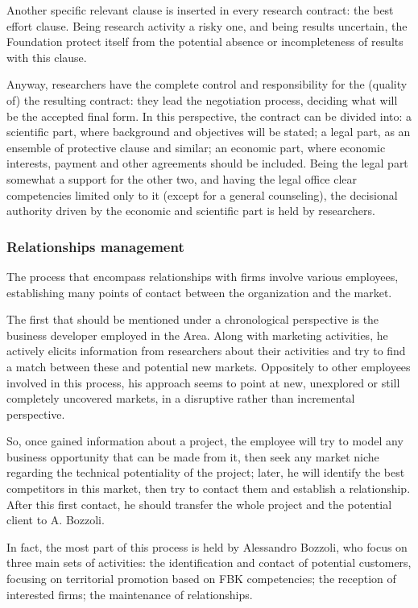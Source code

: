 Another specific relevant clause is inserted in every research contract: the best effort clause. Being research activity a risky one, and being results uncertain, the Foundation protect itself from the potential absence or incompleteness of results with this clause.  

Anyway, researchers have the complete control and responsibility for the (quality of) the resulting contract: they lead the negotiation process, deciding what will be the accepted final form. In this perspective, the contract can be divided into: a scientific part, where background and objectives will be stated; a legal part, as an ensemble of protective clause and similar; an economic part, where economic interests, payment and other agreements should be included. Being the legal part somewhat a support for the other two, and having the legal office clear competencies limited only to it (except for a general counseling), the decisional authority driven by the economic and scientific part is held by researchers.

\subsubsection{Relationships management}

The process that encompass relationships with firms involve various employees, establishing many points of contact between the organization and the market.

The first that should be mentioned under a chronological perspective is the business developer employed in the Area. Along with marketing activities, he actively elicits information from researchers about their activities and try to find a match between these and potential new markets. Oppositely to other employees involved in this process, his approach seems to point at new, unexplored or still completely uncovered markets, in a disruptive rather than incremental perspective. 

So, once gained information about a project, the employee will try to model any business opportunity that can be made from it, then seek any market niche regarding the technical potentiality of the project; later, he will identify the best competitors in this market, then try to contact them and establish a relationship. After this first contact, he should transfer the whole project and the potential client to A. Bozzoli.

In fact, the most part of this process is held by Alessandro Bozzoli, who focus on three main sets of activities: the identification and contact of potential customers, focusing on territorial promotion based on FBK competencies; the reception of interested firms; the maintenance of relationships. 

